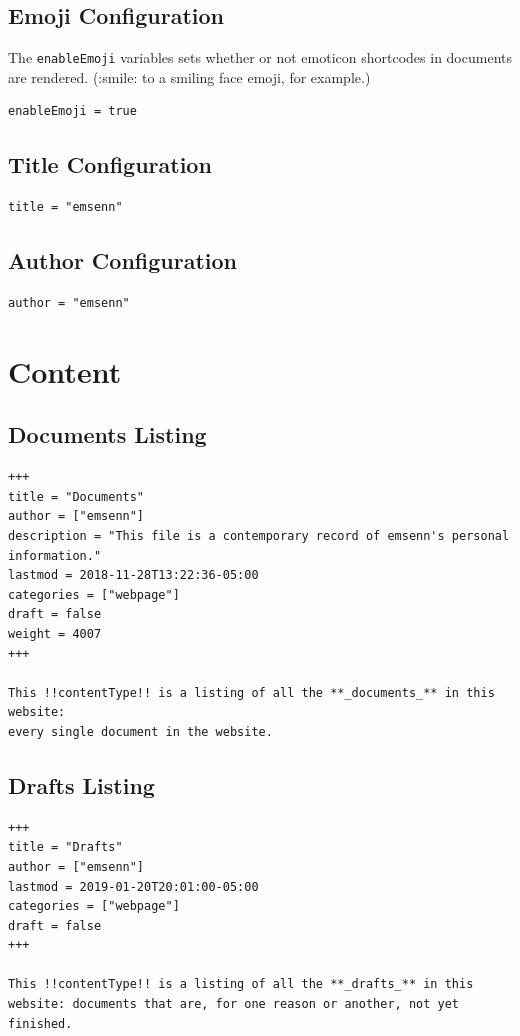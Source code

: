 \documentclass[11pt]{article}
\begin{document}
\subsection{Emoji Configuration}
\label{sec:org6d15089}
The \texttt{enableEmoji} variables sets whether or not emoticon shortcodes in
documents are rendered. (:smile: to a smiling face emoji, for example.)
\begin{verbatim}
enableEmoji = true
\end{verbatim}
\subsection{Title Configuration}
\label{sec:org2d954e7}

\begin{verbatim}
title = "emsenn"
\end{verbatim}
\subsection{Author Configuration}
\label{sec:orge3ba34f}
\begin{verbatim}
author = "emsenn"
\end{verbatim}
\section{Content}
\label{sec:org646b99b}
\subsection{Documents Listing}
\label{sec:orgce6d165}
\begin{verbatim}
+++
title = "Documents"
author = ["emsenn"]
description = "This file is a contemporary record of emsenn's personal information."
lastmod = 2018-11-28T13:22:36-05:00
categories = ["webpage"]
draft = false
weight = 4007
+++

This !!contentType!! is a listing of all the **_documents_** in this website:
every single document in the website.
\end{verbatim}
\subsection{Drafts Listing}
\label{sec:orgc6093ed}
\begin{verbatim}
+++
title = "Drafts"
author = ["emsenn"]
lastmod = 2019-01-20T20:01:00-05:00
categories = ["webpage"]
draft = false
+++

This !!contentType!! is a listing of all the **_drafts_** in this
website: documents that are, for one reason or another, not yet
finished.
\end{verbatim}
\end{document}
